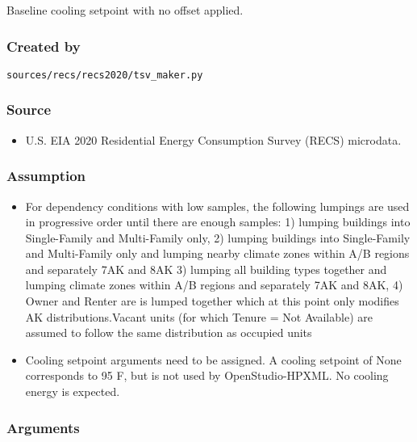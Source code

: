 Baseline cooling setpoint with no offset applied.

\subsubsection{Created by}\label{created-by-22}

\texttt{sources/recs/recs2020/tsv\_maker.py}

\subsubsection{Source}\label{source-22}

\begin{itemize}
 
\item
  U.S. EIA 2020 Residential Energy Consumption Survey (RECS) microdata.
\end{itemize}

\subsubsection{Assumption}\label{assumption-13}

\begin{itemize}
 
\item
  For dependency conditions with low samples, the following lumpings are
  used in progressive order until there are enough samples: 1) lumping
  buildings into Single-Family and Multi-Family only, 2) lumping
  buildings into Single-Family and Multi-Family only and lumping nearby
  climate zones within A/B regions and separately 7AK and 8AK 3) lumping
  all building types together and lumping climate zones within A/B
  regions and separately 7AK and 8AK, 4) Owner and Renter are is lumped
  together which at this point only modifies AK distributions.Vacant
  units (for which Tenure = \textquotesingle Not
  Available\textquotesingle) are assumed to follow the same distribution
  as occupied units
\item
  Cooling setpoint arguments need to be assigned. A cooling setpoint of
  None corresponds to 95 F, but is not used by OpenStudio-HPXML. No
  cooling energy is expected.
\end{itemize}

\subsubsection{Arguments}\label{arguments-13}

